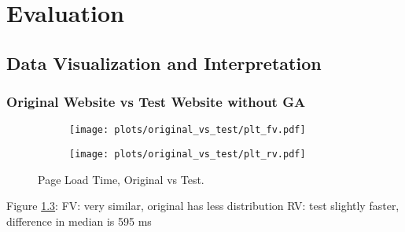 \chapter{Evaluation}
















\section{Data Visualization and Interpretation}





\subsection{Original Website vs Test Website without GA}



\begin{figure}
	\centering
	\begin{subfigure}{.5\textwidth}
		\centering
		\texttt{[image: plots/original\_vs\_test/plt\_fv.pdf]}
		\label{fig:sub1}
	\end{subfigure}%
	\begin{subfigure}{.5\textwidth}
		\centering
		\texttt{[image: plots/original\_vs\_test/plt\_rv.pdf]}
		\label{fig:sub2}
	\end{subfigure}
	\caption{Page Load Time, Original vs Test.}
	\label{figure:plt_original_test}
\end{figure}

Figure \ref{figure:plt_original_test}:
FV: very similar, original has less distribution
RV: test slightly faster, difference in median is 595 ms 


